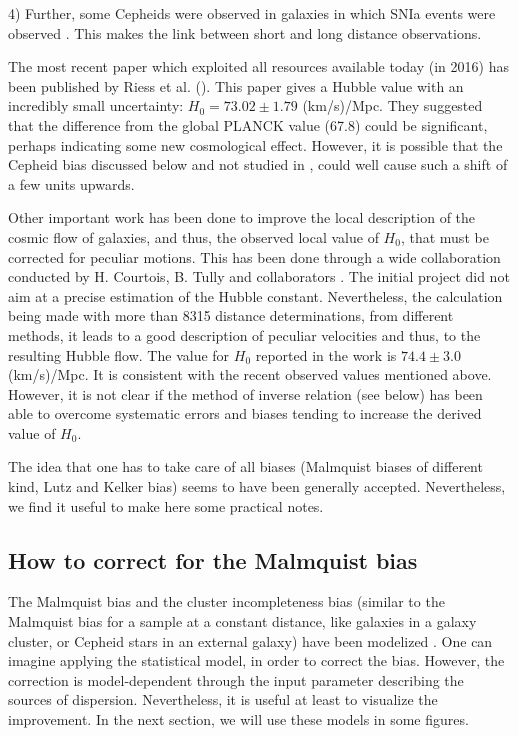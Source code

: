 4) Further, some Cepheids were observed in galaxies in which SNIa events were observed \cite{hoffmann}. This makes the link between short and long distance observations. 

The most recent paper which exploited all resources available today (in 2016) has been published by Riess et al. (\cite{riess2}). This paper gives a Hubble value with an incredibly small uncertainty: $H_0=73.02 \pm 1.79$ (km/s)/Mpc. They suggested  that the difference from the global PLANCK value (67.8) could be significant, perhaps indicating some new cosmological effect. However, it is possible that the Cepheid bias discussed below and not studied in \cite{riess2}, could well cause such a shift of a few units upwards.


Other important work has been done to improve the local description of the cosmic flow of galaxies, and thus, the observed  local value of $H_0$, that must be corrected for peculiar motions. This has been done through a wide collaboration conducted by H. Courtois, B. Tully and collaborators \cite{laniakea}. The initial project did not aim at a precise estimation of the Hubble constant. Nevertheless, the calculation being made with more than 8315 distance determinations, from different methods, it leads to a good description of peculiar velocities and thus, to the resulting Hubble flow. The value for $H_0$ reported in the work is $74.4 \pm 3.0$ (km/s)/Mpc. It  is consistent with the recent observed values mentioned above. However, it is not clear if the method of inverse relation (see below) has been able to overcome systematic errors and biases tending to increase the derived value of $H_0$.

The idea that one has to take care of all biases (Malmquist biases of different kind, Lutz and Kelker bias) seems to have been generally accepted. Nevertheless, we find it useful to make here some practical notes.

\subsection{How to correct for the Malmquist bias}
\label{sec2.4}

The Malmquist bias and the cluster incompleteness bias (similar to the Malmquist bias for a sample at a constant distance, like galaxies in a galaxy cluster, or Cepheid stars in an external galaxy) have been modelized \cite{bias}. One can imagine applying the statistical model, in order to correct the bias. However, the correction is model-dependent through the input parameter describing the sources of dispersion. Nevertheless, it is useful at least to visualize the improvement. In the next section, we will use these models in some figures.

